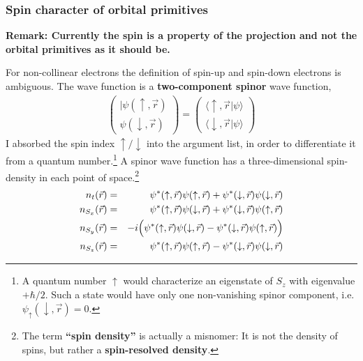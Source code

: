 \documentclass[final,12pt,makeidx,DIV=calc]{article}
\begin{document}
{{{{{{%
\subsubsection{Spin character of orbital primitives}

\textbf{Remark: Currently the spin is a property of the projection and
  not the orbital primitives as it should be.}

For non-collinear electrons the definition of spin-up and spin-down
electrons is ambiguous. The wave function is a \textbf{two-component
  spinor} wave function,
\begin{eqnarray}
\left(\begin{array}{c}|\psi(\uparrow,\vec{r})\\\psi(\downarrow,\vec{r})
\end{array}\right)
=\left(\begin{array}{c}\langle\uparrow,\vec{r}|\psi\rangle\\
\langle\downarrow,\vec{r}|\psi\rangle
\end{array}\right)
\end{eqnarray}
I absorbed the spin index $\uparrow/\downarrow$ into the argument
list, in order to differentiate it from a quantum number.\footnote{A
  quantum number $\uparrow$ would characterize an eigenstate of $S_z$
  with eigenvalue $+\hbar/2$. Such a state would have only one
  non-vanishing spinor component,
  i.e. $\psi_\uparrow(\downarrow,\vec{r})=0$.}  A spinor wave function
has a three-dimensional spin-density in each point of
space.\footnote{The term \textbf{``spin density''}
  is actually a misnomer: It is not the density of spins, but rather a
  \textbf{spin-resolved density}.}
\begin{eqnarray}
n_t(\vec{r})
&=&
\psi^*(\uparrow,\vec{r})\psi(\uparrow,\vec{r})  
+\psi^*(\downarrow,\vec{r})\psi(\downarrow,\vec{r})  
\nonumber\\
n_{S_x}(\vec{r})
&=&
\psi^*(\uparrow,\vec{r})\psi(\downarrow,\vec{r})  
+\psi^*(\downarrow,\vec{r})\psi(\uparrow,\vec{r})  
\nonumber\\
n_{S_y}(\vec{r})
&=&
-i\Bigl(
\psi^*(\uparrow,\vec{r})\psi(\downarrow,\vec{r})  
-\psi^*(\downarrow,\vec{r})\psi(\uparrow,\vec{r})  
\Bigr)
\nonumber\\
n_{S_z}(\vec{r})
&=&
\psi^*(\uparrow,\vec{r})\psi(\uparrow,\vec{r})  
-\psi^*(\downarrow,\vec{r})\psi(\downarrow,\vec{r})  
\nonumber\\
\end{eqnarray}

}}}}}}
\end{document}
